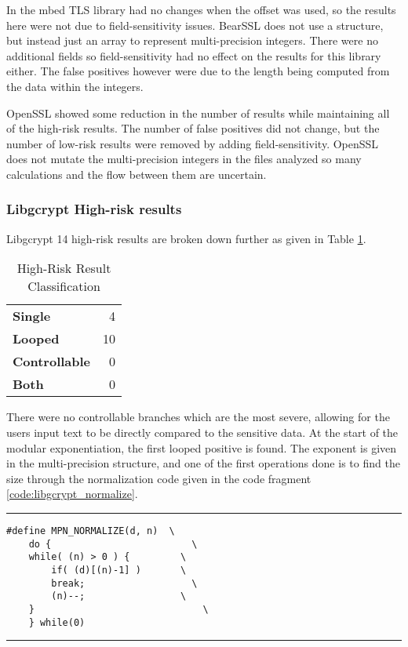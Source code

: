 \documentclass[11pt,a4paper]{article}
\begin{document}
 In the mbed TLS library had no changes when the offset was used, so the results
 here were not due to field-sensitivity issues. BearSSL does not use a structure,
 but instead just an array to represent multi-precision integers. There were no
 additional fields so field-sensitivity had no effect on the results for this
 library either. The false positives however were due to the length being
 computed from the data within the integers.

 OpenSSL showed some reduction in the number of results while maintaining all of
 the high-risk results. The number of false positives did not change, but the
 number of low-risk results were removed by adding field-sensitivity. OpenSSL
 does not mutate the multi-precision integers in the files analyzed so many
 calculations and the flow between them are uncertain. 

\subsubsection{Libgcrypt High-risk results}

Libgcrypt 14 high-risk results are broken down further as given in Table \ref{tbl:libgcrypt_high}.

\begin{table}[h!]
  \centering
  \begin{tabular}{l r}
    \textbf{Single} & 4 \\
    \textbf{Looped}  & 10 \\
    \textbf{Controllable} & 0 \\
    \textbf{Both}  & 0 \\
  \end{tabular}
  \caption{High-Risk Result Classification}
  \label{tbl:libgcrypt_high}
\end{table}

There were no controllable branches which are the most severe, allowing for the
users input text to be directly compared to the sensitive data. At the start of
the modular exponentiation, the first looped positive is found. The exponent is
given in the multi-precision structure, and one of the first operations done is
to find the size through the normalization code given in the code fragment
\ref{code:libgcrypt_normalize}.

\vspace{5pt}
\hrule
\begin{lstlisting}[caption=Libgcrypt 1.8.2 - mpi-internal.h lines 113-120, label=code:libgcrypt_normalize]
#define MPN_NORMALIZE(d, n)  \
    do {		                 \
	while( (n) > 0 ) {         \
	    if( (d)[(n)-1] )       \
		break;	                 \
	    (n)--;	               \
	}		                       \
    } while(0)
\end{lstlisting}
\hrule
\vspace{5pt}
\end{document}
